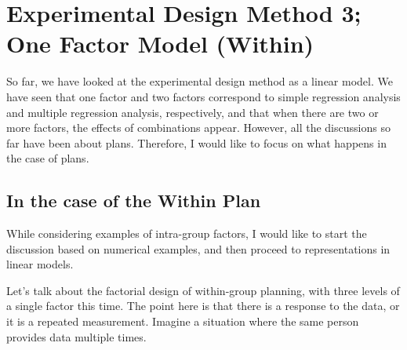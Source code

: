 \documentclass{ltjbook}
\begin{document}
\chapter{Experimental Design Method 3; One Factor Model (Within)}
\label{m14_design3}

So far, we have looked at the experimental design method as a linear model. We have seen that one factor and two factors correspond to simple regression analysis and multiple regression analysis, respectively, and that when there are two or more factors, the effects of combinations appear.
However, all the discussions so far have been about  plans. Therefore, I would like to focus on what happens in the case of  plans.
\section{In the case of the Within Plan}
While considering examples of intra-group factors, I would like to start the discussion based on numerical examples, and then proceed to representations in linear models.

Let's talk about the factorial design of within-group planning, with three levels of a single factor this time. The point here is that there is a response to the data, or it is a repeated measurement. Imagine a situation where the same person provides data multiple times.
\end{document}
